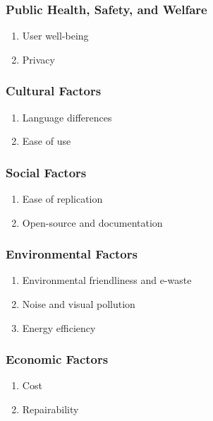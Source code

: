 \subsubsection{Public Health, Safety, and Welfare}
\begin{enumerate}
      \item User well-being
      \item Privacy
\end{enumerate}

\subsubsection{Cultural Factors}
\begin{enumerate}
      \item Language differences
      \item Ease of use
\end{enumerate}

\subsubsection{Social Factors}
\begin{enumerate}
      \item Ease of replication
      \item Open-source and documentation
\end{enumerate}

\subsubsection{Environmental Factors}
\begin{enumerate}
      \item Environmental friendliness and e-waste
      \item Noise and visual pollution
      \item Energy efficiency
\end{enumerate}

\subsubsection{Economic Factors}
\begin{enumerate}
      \item Cost
      \item Repairability
\end{enumerate}